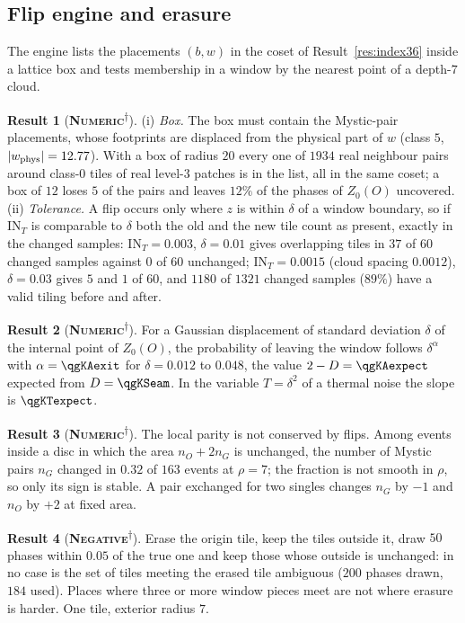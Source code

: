 \documentclass[11pt]{article}
\newcommand{\numeric}{\textbf{\textsc{Numeric}}}
\newcommand{\negres}{\textbf{\textsc{Negative}}}
\newcommand{\snap}{\textsuperscript{$\dagger$}}      %
\theoremstyle{definition}
\newtheorem{result}{Result}
\begin{document}
\subsection{Flip engine and erasure}
The engine lists the placements $(b,w)$ in the coset of Result~\ref{res:index36} inside a lattice box and tests membership in a window by the nearest point of a depth-$7$ cloud.
\begin{result}[\numeric\snap]\label{res:flip-engine}
(i) \emph{Box.} The box must contain the Mystic-pair placements, whose footprints are displaced from the physical part of $w$ (class $5$, $|w_{\rm phys}|=12.77$). With a box of radius $20$ every one of $1934$ real neighbour pairs around class-$0$ tiles of real level-$3$ patches is in the list, all in the same coset; a box of $12$ loses $5$ of the pairs and leaves $12\%$ of the phases of $Z_0(O)$ uncovered. (ii) \emph{Tolerance.} A flip occurs only where $z$ is within $\delta$ of a window boundary, so if $\mathrm{IN}_T$ is comparable to $\delta$ both the old and the new tile count as present, exactly in the changed samples: $\mathrm{IN}_T=0.003$, $\delta=0.01$ gives overlapping tiles in $37$ of $60$ changed samples against $0$ of $60$ unchanged; $\mathrm{IN}_T=0.0015$ (cloud spacing $0.0012$), $\delta=0.03$ gives $5$ and $1$ of $60$, and $1180$ of $1321$ changed samples ($89\%$) have a valid tiling before and after.
\end{result}
\begin{result}[\numeric\snap]\label{res:phason}
For a Gaussian displacement of standard deviation $\delta$ of the internal point of $Z_0(O)$, the probability of leaving the window follows $\delta^{\alpha}$ with $\alpha=\qgKAexit$ for $\delta=0.012$ to $0.048$, the value $2-D=\qgKAexpect$ expected from $D=\qgKSeam$. In the variable $T=\delta^2$ of a thermal noise the slope is $\qgKTexpect$.
\end{result}
\begin{result}[\numeric\snap]\label{res:flip-parity-change}
The local parity is not conserved by flips. Among events inside a disc in which the area $n_O+2n_G$ is unchanged, the number of Mystic pairs $n_G$ changed in $0.32$ of $163$ events at $\rho=7$; the fraction is not smooth in $\rho$, so only its sign is stable. A pair exchanged for two singles changes $n_G$ by $-1$ and $n_O$ by $+2$ at fixed area.
\end{result}
\begin{result}[\negres\snap]\label{res:flip-erasure}
Erase the origin tile, keep the tiles outside it, draw $50$ phases within $0.05$ of the true one and keep those whose outside is unchanged: in no case is the set of tiles meeting the erased tile ambiguous ($200$ phases drawn, $184$ used). Places where three or more window pieces meet are not where erasure is harder. One tile, exterior radius $7$.
\end{result}
\end{document}
